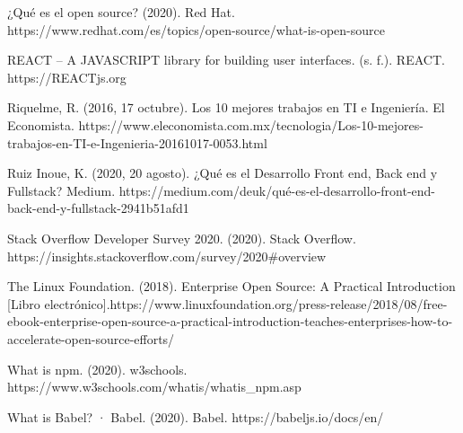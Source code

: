\begin{thebibliography}{100}
\bibitem{} ¿Qué es el open source? (2020). Red Hat. https://www.redhat.com/es/topics/open-source/what-is-open-source

 REACT – A JAVASCRIPT library for building user interfaces. (s. f.). REACT. https://REACTjs.org

 Riquelme, R. (2016, 17 octubre). Los 10 mejores trabajos en TI e Ingeniería. El Economista. https://www.eleconomista.com.mx/tecnologia/Los-10-mejores-trabajos-en-TI-e-Ingenieria-20161017-0053.html

 Ruiz Inoue, K. (2020, 20 agosto). ¿Qué es el Desarrollo Front end, Back end y Fullstack? Medium. https://medium.com/deuk/qué-es-el-desarrollo-front-end-back-end-y-fullstack-2941b51afd1

 Stack Overflow Developer Survey 2020. (2020). Stack Overflow. https://insights.stackoverflow.com/survey/2020#overview

 The Linux Foundation. (2018). Enterprise Open Source: A Practical Introduction [Libro electrónico].https://www.linuxfoundation.org/press-release/2018/08/free-ebook-enterprise-open-source-a-practical-introduction-teaches-enterprises-how-to-accelerate-open-source-efforts/

 What is npm. (2020). w3schools. https://www.w3schools.com/whatis/whatis_npm.asp

 What is Babel? · Babel. (2020). Babel. https://babeljs.io/docs/en/



\end{thebibliography}